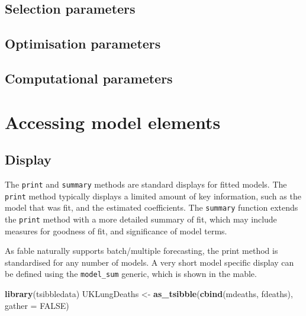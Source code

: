 \documentclass[]{book}
\newenvironment{Shaded}{\begin{snugshade}}{\end{snugshade}}
\newcommand{\DataTypeTok}[1]{\textcolor[rgb]{0.13,0.29,0.53}{#1}}
\newcommand{\KeywordTok}[1]{\textcolor[rgb]{0.13,0.29,0.53}{\textbf{#1}}}
\newcommand{\NormalTok}[1]{#1}
\newcommand{\OtherTok}[1]{\textcolor[rgb]{0.56,0.35,0.01}{#1}}
\newcommand{\StringTok}[1]{\textcolor[rgb]{0.31,0.60,0.02}{#1}}
\begin{document}
\hypertarget{selection-parameters}{%
\section{Selection parameters}\label{selection-parameters}}

\hypertarget{optimisation-parameters}{%
\section{Optimisation parameters}\label{optimisation-parameters}}

\hypertarget{computational-parameters}{%
\section{Computational parameters}\label{computational-parameters}}

\hypertarget{accessing-model-elements}{%
\chapter{Accessing model elements}\label{accessing-model-elements}}

\hypertarget{display}{%
\section{Display}\label{display}}

The \texttt{print} and \texttt{summary} methods are standard displays for fitted models. The \texttt{print} method typically displays a limited amount of key information, such as the model that was fit, and the estimated coefficients. The \texttt{summary} function extends the \texttt{print} method with a more detailed summary of fit, which may include measures for goodness of fit, and significance of model terms.

As fable naturally supports batch/multiple forecasting, the print method is standardised for any number of models. A very short model specific display can be defined using the \texttt{model\_sum} generic, which is shown in the mable.

\begin{Shaded}
\begin{Highlighting}[]
\KeywordTok{library}\NormalTok{(tsibbledata)}
\NormalTok{UKLungDeaths <-}\StringTok{ }\KeywordTok{as_tsibble}\NormalTok{(}\KeywordTok{cbind}\NormalTok{(mdeaths, fdeaths), }\DataTypeTok{gather =} \OtherTok{FALSE}\NormalTok{)}
\end{Highlighting}
\end{Shaded}
\end{document}
